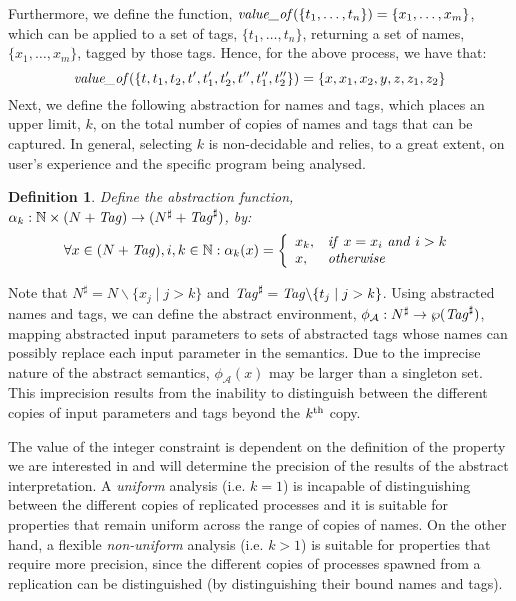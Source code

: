 \documentclass[10pt,a4paper,final,oneside,fleqn]{book}
\begin{document}
\noindent
Furthermore, we define the function, $\mbox{{\itshape value\_of\/}}(\{t_1,\ldots,t_n\})=\{x_1,\ldots,x_m\}$, which can be applied to a set of tags, $\{t_1,\ldots,t_n\}$, returning a set of names, $\{x_1,\ldots,x_m\}$, tagged by those tags.  Hence, for the above process, we have that:\[\mbox{{\itshape value\_of\/}}(\{t, t_1, t_2, t', t'_1, t'_2, t'', t''_1, t''_2\})=\{x, x_1, x_2, y, z, z_1, z_2\}\]
Next, we define the following abstraction for names and tags, which places an upper limit, $k$, on the total number of copies of names and tags that can be captured.  In general, selecting $k$ is non-decidable and relies, to a great extent, on user's experience and the specific program being analysed.
\newtheorem{defn}{Definition}
\begin{defn}
Define the abstraction function, $\alpha_k:\mathbb{N}\times(N+\mbox{{\itshape Tag\/}})\to(N^\sharp+\mbox{{\itshape Tag\/}}^\sharp)$, by:
\[\forall x\in(N+\mbox{{\itshape Tag\/}}),i,k\in\mathbb{N}:\alpha_k(x)=\left\{\begin{array}{ll}
x_{k},&\mbox{{\itshape if\/} }x=x_i\mbox{ {\itshape and\/} }i>k\\
x,&\mbox{{\itshape otherwise\/}}
\end{array}\right.\]\end{defn}
Note that $N^\sharp=N\backslash\{x_j\mid j>k\}$ and $\mbox{{\itshape Tag\/}}^\sharp=\mbox{{\itshape Tag\/}}\backslash\{t_j\mid j>k\}$.  Using abstracted names and tags, we can define the abstract environment, $\phi_\mathcal{A}:N^\sharp\to\wp(\mbox{{\itshape Tag\/}}^\sharp)$, mapping abstracted input parameters to sets of abstracted tags whose names can possibly replace each input parameter in the semantics. Due to the imprecise nature of the abstract semantics, $\phi_\mathcal{A}(x)$ may be larger than a singleton set. This imprecision results from the inability to distinguish between the different copies of input parameters and tags beyond the $k^{\rm th}$ copy.

The value of the integer constraint is dependent on the definition of the property we are interested in and will determine the precision of the results of the abstract interpretation.  A {\itshape uniform\/} analysis (i.e. $k=1$) is incapable of distinguishing between the different copies of replicated processes and it is suitable for properties that remain uniform across the range of copies of names.  On the other hand, a flexible {\itshape non-uniform\/} analysis (i.e. $k>1$) is suitable for properties that require more precision, since the different copies of processes spawned from a replication can be distinguished (by distinguishing their bound names and tags).
\end{document}
